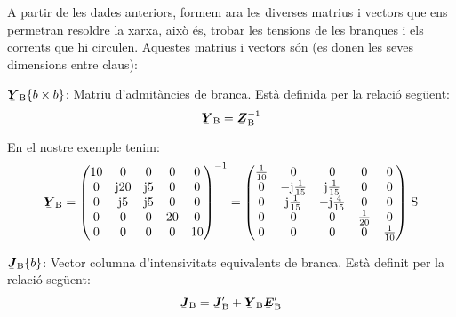 A partir de les dades anteriors, formem ara les diverses matrius i
vectors que ens permetran resoldre la xarxa, aix\`{o} \'{e}s, trobar les
tensions de les branques i els corrents que hi circulen. Aquestes
matrius i vectors s\'{o}n (es donen les seves dimensions entre claus):

\begin{list}{}
{\setlength{\labelwidth}{20mm} \setlength{\leftmargin}{22mm} \setlength{\labelsep}{2mm}}
   \item[$\mcmplx{Y}\ped{B}\{b\times b\}$:] Matriu d'admit\`{a}ncies de branca. Est\`{a} definida per la relaci\'{o} seg\"{u}ent:
   \begin{equation}
      \mcmplx{Y}\ped{B} = \mcmplx{Z}\ped{B}^{-1}
   \end{equation}

   En el nostre exemple tenim:
   \[
      \mcmplx{Y}\ped{B} = \begin{pmatrix}
            10 & 0 & 0 & 0 & 0 \\
            0 & \ju 20 & \ju 5 & 0 & 0 \\
            0 & \ju 5 & \ju 5 & 0 & 0 \\
            0 & 0 & 0 & 20 & 0 \\
            0 & 0 & 0 & 0 & 10
      \end{pmatrix} ^{-1} =
      \begin{pmatrix}
            \frac{1}{10} & 0 & 0 & 0 & 0 \\
            0 & -\ju\frac{1}{15} & \ju\frac{1}{15} & 0 & 0 \\
            0 & \ju\frac{1}{15} & -\ju\frac{4}{15} & 0 & 0 \\
            0 & 0 & 0 & \frac{1}{20} & 0 \\
            0 & 0 & 0 & 0 & \frac{1}{10}
      \end{pmatrix}\unit{S}
   \]

   \item[$\mcmplx{J}\ped{B}\{b\}$:] Vector columna d'intensivitats equivalents de branca. Est\`{a} definit per la relaci\'{o} seg\"{u}ent:
   \begin{equation}
      \mcmplx{J}\ped{B} = \mcmplx{J}'\ped{B}  + \mcmplx{Y}\ped{B} \mcmplx{E}'\ped{B}
   \end{equation}


\end{list}
